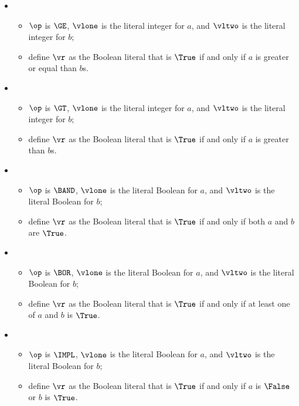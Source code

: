 \begin{itemize}
  \item {}
  \begin{itemize}
    \item $\op$ is $\GE$, $\vlone$ is the literal integer for $a$, and $\vltwo$ is the literal integer for $b$;
    \item define $\vr$ as the Boolean literal that is $\True$ if and only if $a$ is greater or equal than $b$s.
  \end{itemize}

  \item {}
  \begin{itemize}
    \item $\op$ is $\GT$, $\vlone$ is the literal integer for $a$, and $\vltwo$ is the literal integer for $b$;
    \item define $\vr$ as the Boolean literal that is $\True$ if and only if $a$ is greater than $b$s.
  \end{itemize}

  \item {}
  \begin{itemize}
    \item $\op$ is $\BAND$, $\vlone$ is the literal Boolean for $a$, and $\vltwo$ is the literal Boolean for $b$;
    \item define $\vr$ as the Boolean literal that is $\True$ if and only if both $a$ and $b$ are $\True$.
  \end{itemize}

  \item {}
  \begin{itemize}
    \item $\op$ is $\BOR$, $\vlone$ is the literal Boolean for $a$, and $\vltwo$ is the literal Boolean for $b$;
    \item define $\vr$ as the Boolean literal that is $\True$ if and only if at least one of $a$ and $b$ is $\True$.
  \end{itemize}

  \item {}
  \begin{itemize}
    \item $\op$ is $\IMPL$, $\vlone$ is the literal Boolean for $a$, and $\vltwo$ is the literal Boolean for $b$;
    \item define $\vr$ as the Boolean literal that is $\True$ if and only if $a$ is $\False$ or $b$ is $\True$.
  \end{itemize}


\end{itemize}
